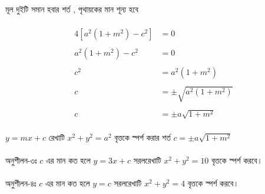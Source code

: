 \documentclass{article}
\begin{document}
	\\
	মূল দুইটি সমান হবার শর্ত , পৃথায়কের মান  শূন্য হবে \\
	\\
	\begin{align*}
		4[a^2(1+m^2)-c^2]&=0\\
		\\
		a^2(1+m^2)-c^2&=0\\
		\\
		c^2&=a^2(1+m^2)\\
		\\
		c&=\pm \sqrt{a^2(1+m^2)}\\
		\\
		c&=\pm a\sqrt{1+m^2}
	\end{align*}
	\\
	$y=mx+c$ রেখাটি  $x^2+y^2=a^2$ বৃত্তকে স্পর্শ করার শর্ত  $c=\pm a\sqrt{1+m^2}$\\
	\\ 
	অনুশীলন-৩ঃ  $c$ এর মান কত হলে  $y=3x+c$ সরলরেখাটি $x^2+y^2=10$ বৃত্তকে স্পর্শ করবে। \\
	\\
	অনুশীলন-৪ঃ   $c$ এর মান কত হলে  $y=c$ সরলরেখাটি $x^2+y^2=4$ বৃত্তকে স্পর্শ করবে। \\
\end{document}
